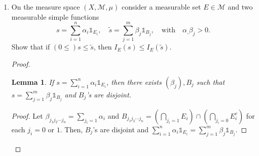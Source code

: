 \documentclass{article}
\newtheorem{lemma}{Lemma}
\begin{document}
\begin{enumerate}[font = \Large\bfseries\itshape\space, leftmargin = 3mm, labelsep = 3mm]
\begin{proof}
\begin{enumerate}[label = Case \arabic*:]
\item $I_i = [a_i, b_i]$\\
By the definition of limitness, there there exists $b_i'$ in $(b_i, a_{i+1})$ such that $\alpha(b_i') < \lim_{x\rightarrow b_i'-}\alpha(x) + \frac{\epsilon}{2n}$.
Similarly, there exists $a_i'$ in $(b_{i-1}, a_i)$ such that $\alpha(a_i') > \lim_{x\rightarrow a_i -}\alpha(x) - \frac{\epsilon}{2n}$.
Now, let $G_i = (a_i', b_i')$.

\item $I_i = (a_i, b_i]$\\
By the definition of limitness, there there exists $b_i'$ in $(b_i, a_{i+1})$ such that $\alpha(b_i') < \lim_{x\rightarrow b_i'-}\alpha(x) + \frac{\epsilon}{2n}$.
Let $a_i = a_i'$
Now, let $G_i = (a_i', b_i')$.

\item $I_i = (a_i, b_i)$\\
Let $a_i = a_i'$ and $b_i = b_i'$.
Now, let $G_i = (a_i', b_i')$.
\end{enumerate}
From each case, $I_i \subset G_i$, $G_i$'s are open, and $\mu(G_i \backslash I_i) < \frac{\epsilon}{n}$.
Therefore, $G = \bigcup_{i=1}^n G_i$ satisfies $A \subset G$, $G$ is open, and $\mu(G \backslash A) < \epsilon$.

For the multi-dimensional $\mathcal{E}$, for any arbitrary set $A$, let $A = \bigcup_{i=1}^n I_i \in \mathcal{E}$, and $I_i$'s are boxes.
Similar to $1$-dimensional case, we only needs to define open sets $G_i$ such that $I_i \subset G_i$ and $\mu(G_i\backslash I_i) < \frac{\epsilon}{n}$, and it is true by the definition of limit with identical process of $1$-dimensional case.
\end{proof}

\item
On the measure space $(X, \mathcal{M}, \mu)$ consider a measurable set $E \in \mathcal{M}$ and two measurable simple functions
$$
s = \sum_{i=1}^n \alpha_i \mathbb{1}_{E_i}, \quad
\tilde{s} = \sum_{j=1}^m \beta_j \mathbb{1}_{B_j}, \quad
\text{with} \quad \alpha_, \beta_j > 0.
$$
Show that if $(0 \leq) s \leq \tilde{s}$, then $I_E(s) \leq I_E(\tilde{s})$.

\begin{proof}
\begin{lemma}
If $s = \sum_{i=1}^n \alpha_i \mathbb{1}_{E_i}$, then there exists $(\beta_j), B_j$ such that $s = \sum_{j=1}^m \beta_j \mathbb{1}_{B_j}$ and $B_j$'s are disjoint.
\end{lemma}
\begin{proof}
Let $\beta_{j_1j_2\cdots j_n} = \sum_{j_i=1} \alpha_i$ and $B_{j_1 j_2 \cdots j_n} = \left(\bigcap_{j_i = 1} E_i\right) \cap \left(\bigcap_{j_i = 0} E_i^c\right)$ for each $j_i = 0$ or $1$.
Then, $B_j$'s are disjoint and $\sum_{i=1}^n \alpha_i \mathbb{1}_{E_i} =  \sum_{j=1}^m \beta_j \mathbb{1}_{B_j}$.
\end{proof}


\end{proof}
\end{enumerate}
\end{document}
